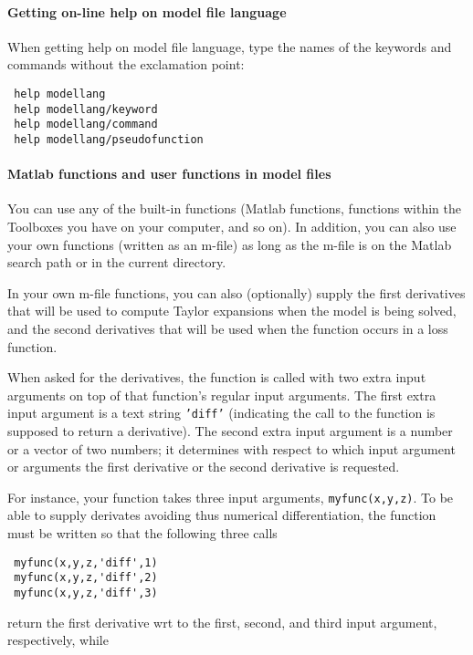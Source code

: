  \paragraph{Getting on-line help on model file language}
 
 When getting help on model file language, type the names of the keywords
 and commands without the exclamation point:
 
 \begin{verbatim}
 help modellang
 help modellang/keyword
 help modellang/command 
 help modellang/pseudofunction
 \end{verbatim}
 
 \paragraph{Matlab functions and user functions in model files}
 
 You can use any of the built-in functions (Matlab functions, functions
 within the Toolboxes you have on your computer, and so on). In addition,
 you can also use your own functions (written as an m-file) as long as
 the m-file is on the Matlab search path or in the current directory.
 
 In your own m-file functions, you can also (optionally) supply the first
 derivatives that will be used to compute Taylor expansions when the
 model is being solved, and the second derivatives that will be used when
 the function occurs in a loss function.
 
 When asked for the derivatives, the function is called with two extra
 input arguments on top of that function's regular input arguments. The
 first extra input argument is a text string \texttt{'diff'} (indicating
 the call to the function is supposed to return a derivative). The second
 extra input argument is a number or a vector of two numbers; it
 determines with respect to which input argument or arguments the first
 derivative or the second derivative is requested.
 
 For instance, your function takes three input arguments,
 \texttt{myfunc(x,y,z)}. To be able to supply derivates avoiding thus
 numerical differentiation, the function must be written so that the
 following three calls
 
 \begin{verbatim}
 myfunc(x,y,z,'diff',1)
 myfunc(x,y,z,'diff',2)
 myfunc(x,y,z,'diff',3)
 \end{verbatim}
 
 return the first derivative wrt to the first, second, and third input
 argument, respectively, while
 
